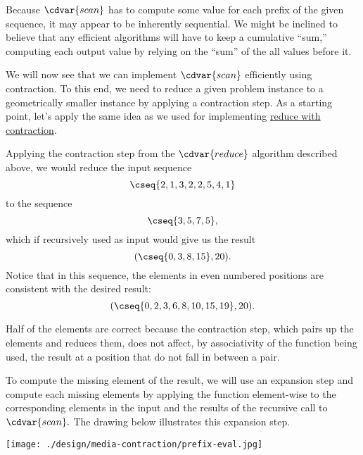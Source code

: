 \begin{cluster}
\label{grp:grm:design::contraction::scan-via-contraction-the-intuition}

\begin{gram}
\label{grm:design::contraction::scan-via-contraction-the-intuition}
Because $\cdvar{scan}$ has to compute some value for each
prefix of the given sequence, it may appear to be inherently sequential.  
We might be inclined to believe that any efficient algorithms will
have to keep a cumulative ``sum,'' computing each output value by
relying on the ``sum'' of the all values before it.  

We will now see that we can implement $\cdvar{scan}$ efficiently using contraction.  To this
end, we need to reduce a given problem instance to a geometrically
smaller instance by applying a contraction step.
As a starting point, let's apply the same idea as we used for
implementing 
\href{alg:design::contraction::reduce}{reduce with contraction}.

Applying the contraction step from the $\cdvar{reduce}$ algorithm
described above, we would reduce the input sequence
\[
\cseq{2,1,3,2,2,5,4,1}
\]
to the sequence
\[
\cseq{3,5,7,5},
\]
which if recursively used as input would give us the result
\[
(\cseq{ 0, 3, 8, 15 }, 20).
\]
Notice that in this sequence, the elements in even numbered positions are consistent with the desired result:
\[
(\cseq{0, 2, 3, 6, 8, 10, 15, 19}, 20).
\]

Half of the elements are correct because the
contraction step, which pairs up the elements and reduces them, does
not affect, by associativity of the function being used, the result at
a position that do not fall in between a pair.  

To compute the missing element of the result, we will use an expansion
step and compute each missing elements by applying
the function element-wise to the corresponding elements in the input and the results of the recursive call to $\cdvar{scan}.$
The drawing below illustrates this expansion step.
\begin{center}
  \texttt{[image: ./design/media-contraction/prefix-eval.jpg]}
\end{center}

\end{gram}
\end{cluster}

